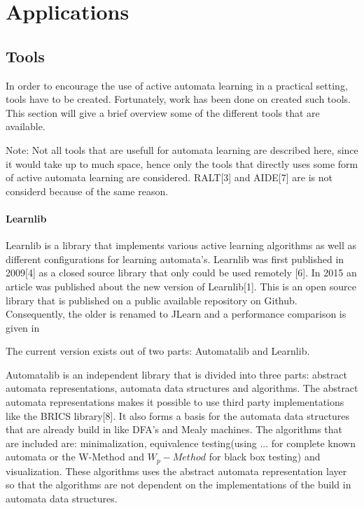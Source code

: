 \documentclass[multi,crop=false,class=article]{standalone}
\begin{document}
\section{Applications}
\label{sec:applications}

\subsection{Tools}

In order to encourage the use of active automata learning in a practical setting, tools have 
to be created. Fortunately, work has been done on created such tools.
This section will give a brief overview some of the different tools that are available. 

Note: Not all tools that are usefull for automata learning are described here, since it would take up to much
space, hence only the tools that directly uses some form of active automata learning are considered. RALT[3] and AIDE[7] 
are is not considerd because of the same reason.


\paragraph{Learnlib}

Learnlib is a library that implements various active learning algorithms as well as different configurations for learning automata's.
Learnlib was first published in 2009[4] as a closed source library that only could be used remotely [6]. In 2015 an article
was published about the new version of Learnlib[1]. This is an open source library that is published on a public available repository
on Github. Consequently, the older is renamed to JLearn and a performance comparison is given in %

The current version exists out of two parts: Automatalib and Learnlib.

Automatalib is an independent library that is divided into three parts: abstract automata representations, automata data structures and algorithms. The abstract automata representations makes it possible to use third party implementations like the BRICS library[8]. 
It also forms a basis for the automata data structures that are already build in like DFA's and Mealy machines.
The algorithms that are included are: minimalization, equivalence testing(using ... for complete known automata or the W-Method and $W_p-Method$ for black box testing) and visualization. These algorithms uses the abstract automata representation layer so that the algorithms are not dependent on the implementations of the build in automata data structures.
\end{document}
